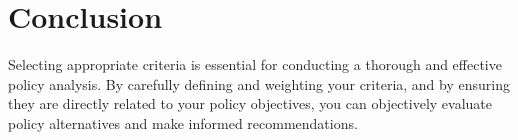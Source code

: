 \documentclass{article}
\theoremstyle{definition}
\theoremstyle{plain}
\begin{document}
\section{Conclusion}

Selecting appropriate criteria is essential for conducting a thorough and effective policy analysis. By carefully defining and weighting your criteria, and by ensuring they are directly related to your policy objectives, you can objectively evaluate policy alternatives and make informed recommendations.











% 
\end{document}
